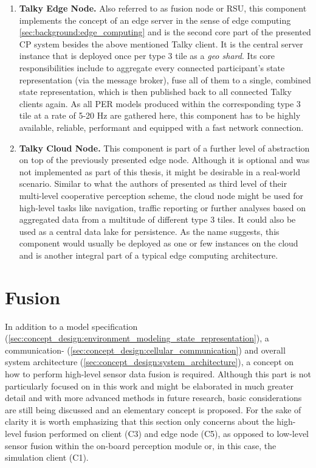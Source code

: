 \begin{enumerate}[C1: ]
	\item \textbf{Talky Edge Node.} Also referred to as fusion node or RSU, this component implements the concept of an edge server in the sense of edge computing \autoref{sec:background:edge_computing} and is the second core part of the presented CP system besides the above mentioned Talky client. It is the central server instance that is deployed once per type 3 tile as a \textit{geo shard}. Its core responsibilities include to aggregate every connected participant's state representation (via the message broker), fuse all of them to a single, combined state representation, which is then published back to all connected Talky clients again. As all PER models produced within the corresponding type 3 tile at a rate of 5-20 \si{\hertz} are gathered here, this component has to be highly available, reliable, performant and equipped with a fast network connection.
	\item \textbf{Talky Cloud Node.} This component is part of a further level of abstraction on top of the previously presented edge node. Although it is optional and was not implemented as part of this thesis, it might be desirable in a real-world scenario. Similar to what the authors of \cite{Calvo2017} presented as third level of their multi-level cooperative perception scheme, the cloud node might be used for high-level tasks like navigation, traffic reporting or further analyses based on aggregated data from a multitude of different type 3 tiles. It could also be used as a central data lake for persistence. As the name suggests, this component would usually be deployed as one or few instances on the cloud and is another integral part of a typical edge computing architecture. 
\end{enumerate}

\section{Fusion}
\label{sec:concept_design:fusion}
In addition to a model specification (\autoref{sec:concept_design:environment_modeling_state_representation}), a communication- (\autoref{sec:concept_design:cellular_communication}) and overall system architecture (\autoref{sec:concept_design:system_architecture}), a concept on how to perform high-level sensor data fusion is required. Although this part is not particularly focused on in this work and might be elaborated in much greater detail and with more advanced methods in future research, basic considerations are still being discussed and an elementary concept is proposed. For the sake of clarity it is worth emphasizing that this section only concerns about the high-level fusion performed on client (C3) and edge node (C5), as opposed to low-level sensor fusion within the on-board perception module or, in this case, the simulation client (C1).

